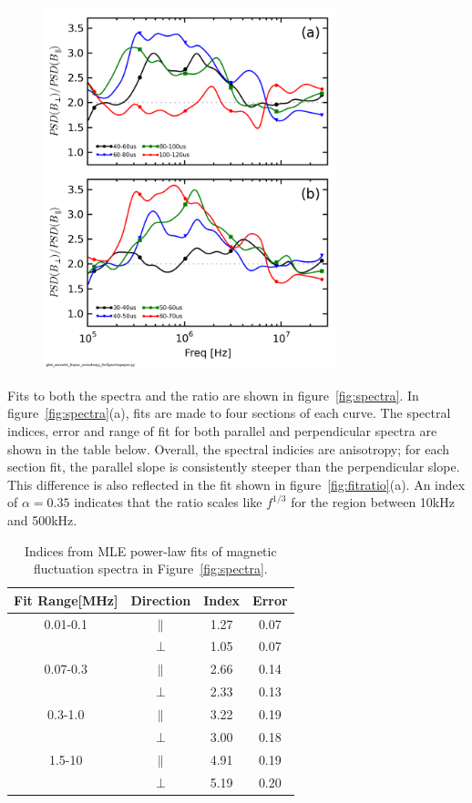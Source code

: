 \documentclass[aip,prl,amsmath,amssymb,reprint,superscriptaddress]{revtex4-1} %
\begin{document}
\begin{figure}[!htbp]
\centerline{
\includegraphics[width=8.5cm]{Bperppara_chan1t4_1mWbspectra_timescan}}
\caption{\label{fig:timeratio}}
\end{figure}

Fits to both the spectra and the ratio are shown in figure~\ref{fig:spectra}. In figure~\ref{fig:spectra}(a), fits are made to four sections of each curve. The spectral indices, error and range of fit for both parallel and perpendicular spectra are shown in the table below. Overall, the spectral indicies are anisotropy; for each section fit, the parallel slope is consistently steeper than the perpendicular slope. This difference is also reflected in the fit shown in figure~\ref{fig:fitratio}(a). An index of $\alpha = 0.35$ indicates that the ratio scales like $f^{1/3}$ for the region between 10kHz and 500kHz.

\begin{table}
\caption{\label{tab:Bindices}Indices from MLE power-law fits of magnetic fluctuation spectra in Figure~\ref{fig:spectra}.}
\begin{tabular}{cccc}
\toprule
Fit Range[MHz]	&	Direction		&	Index	&Error\\
\hline
0.01-0.1				& $\parallel$	& 1.27	&0.07\\
								& $\perp$			& 1.05  &0.07\\
\hline
0.07-0.3				& $\parallel$	& 2.66	&0.14\\
								& $\perp$			& 2.33  &0.13\\
\hline
0.3-1.0					& $\parallel$	& 3.22	&0.19\\
								& $\perp$			& 3.00  &0.18\\
\hline
1.5-10					& $\parallel$	& 4.91	&0.19\\
								& $\perp$			& 5.19  &0.20\\
\hline
\end{tabular}
\end{table}
\end{document}
